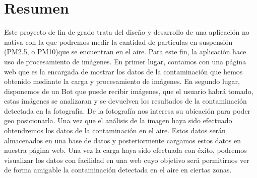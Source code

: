 \documentclass[a4paper,openany,12pt]{book}
\begin{document}

\pagestyle{fancy}

\lhead{}

\chead{}

\rhead{}

\cfoot{}

\fancyfoot[L]{\thepage} 

\renewcommand{\headrulewidth}{0pt} 


\newpage

\newpage
\frontmatter

\setcounter{page}{3}

\section*{Resumen}
\thispagestyle{fancy}
Este proyecto de fin de grado trata del diseño y desarrollo de una aplicación no nativa con la que podremos medir la cantidad de partículas en suspensión (PM2.5, o PM10)que se encuentran en el aire. 
Para este fin, la aplicación hace uso de procesamiento de imágenes.
En primer lugar, contamos con una página web que es la encargada de mostrar los datos de la contaminación que hemos obtenido mediante la carga y procesamiento de imágenes.
En segundo lugar, disponemos de un Bot que puede recibir imágenes, que el usuario habrá tomado, estas imágenes se analizaran y se devuelven los resultados de la contaminación detectada en la fotografía.
De la fotografía nos interesa su ubicación para poder geo posicionarla. Una vez que el análisis de la imagen  haya sido efectuado obtendremos los datos de la contaminación en el aire. Estos datos serán almacenados en una base de datos y posteriormente cargamos estos datos en nuestra página web. 
Una vez la carga haya sido efectuada con éxito, podremos visualizar los datos con facilidad en una web cuyo objetivo será permitirnos ver de forma amigable la contaminación detectada en el aire en ciertas zonas.
\end{document}
